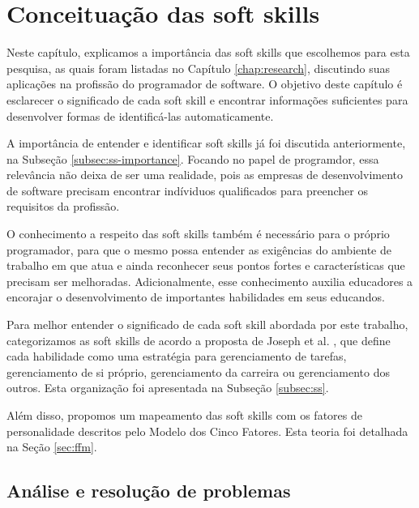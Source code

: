 

\chapter{Conceituação das soft skills}

\label{chap:concepts}
\thispagestyle{empty} %

Neste capítulo, explicamos a importância das soft skills que escolhemos para esta pesquisa, as quais foram listadas no Capítulo \ref{chap:research}, discutindo suas aplicações na profissão do programador de software. O objetivo deste capítulo é esclarecer o significado de cada soft skill e encontrar informações suficientes para desenvolver formas de identificá-las automaticamente.

A importância de entender e identificar soft skills já foi discutida anteriormente, na Subseção \ref{subsec:ss-importance}. Focando no papel de programdor, essa relevância não deixa de ser uma realidade, pois as empresas de desenvolvimento de software precisam encontrar indíviduos qualificados para preencher os requisitos da profissão.

O conhecimento a respeito das soft skills também é necessário para o próprio programador, para que o mesmo possa entender as exigências do ambiente de trabalho em que atua e ainda reconhecer seus pontos fortes e características que precisam ser melhoradas. Adicionalmente, esse conhecimento auxilia educadores a encorajar o desenvolvimento de importantes habilidades em seus educandos.

Para melhor entender o significado de cada soft skill abordada por este trabalho, categorizamos as soft skills de acordo a proposta de Joseph et al. \cite{joseph:99} \cite{joseph:10}, que define cada habilidade como uma estratégia para gerenciamento de tarefas, gerenciamento de si próprio, gerenciamento da carreira ou gerenciamento dos outros. Esta organização foi apresentada na Subseção \ref{subsec:ss}.

Além disso, propomos um mapeamento das soft skills com os fatores de personalidade descritos pelo Modelo dos Cinco Fatores. Esta teoria foi detalhada na Seção \ref{sec:ffm}.

\section{Análise e resolução de problemas}

